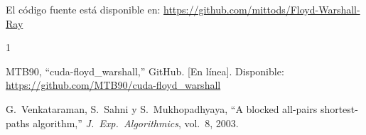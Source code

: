 \documentclass[conference]{IEEEtran}
\begin{document}
El código fuente está disponible en:
\url{https://github.com/mittods/Floyd-Warshall-Ray}

\begin{thebibliography}{1}

 MTB90, ``cuda-floyd\_warshall,'' GitHub. [En línea].
Disponible: \url{https://github.com/MTB90/cuda-floyd_warshall}

 G.\ Venkataraman, S.\ Sahni y S.\ Mukhopadhyaya,
``A blocked all-pairs shortest-paths algorithm,'' \textit{J.\ Exp.\ Algorithmics},
vol.\ 8, 2003.

\end{thebibliography}
\end{document}
